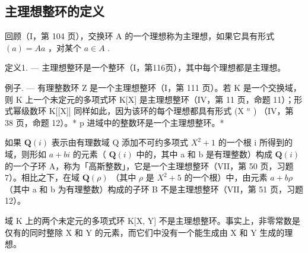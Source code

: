 \subsection{主理想整环的定义}

回顾（I，第 104 页），交换环 A 的一个理想称为主理想，如果它具有形式 \((a) = A a\) ，对某个 \(a \in A\) .

定义1. --- 主理想整环是一个整环（I，第116页），其中每个理想都是主理想。

例子. --- 有理整数环 Z 是一个主理想整环（I，第 111 页）。若 K 是一个交换域，则 K 上一个未定元的多项式环 K{[}X{]} 是主理想整环（IV，第 11 页，命题 11）；形式幂级数环 K{[}{[}X{]}{]} 同样如此，因为该环的每个理想都具有形式 (X \(^{n}\) ) （IV，第 38 页，命题 12）。* p 进域中的整数环是一个主理想整环。*

如果 \(\mathbf{Q}(i)\) 表示由有理数域 Q 添加不可约多项式 \(X^{2}+1\) 的一个根 i 所得到的域，则形如 \(a+bi\) 的元素（ \(\mathbf{Q}(i)\) 中的，其中 a 和 b 是有理整数）构成 \(\mathbf{Q}(i)\) 的一个子环 A，称为「高斯整数」，它是一个主理想整环（VII，第 50 页，习题 7）。相比之下，在域 \(\mathbf{Q}(\rho)\) （其中 \(\rho\) 是 \(X^{2}+5\) 的一个根）中，由元素 \(a+b\rho\) （其中 a 和 b 为有理整数）构成的子环 B 不是主理想整环（VII，第 51 页，习题 12）。

域 K 上的两个未定元的多项式环 K{[}X, Y{]} 不是主理想整环。事实上，非零常数是仅有的同时整除 X 和 Y 的元素，而它们中没有一个能生成由 X 和 Y 生成的理想。

